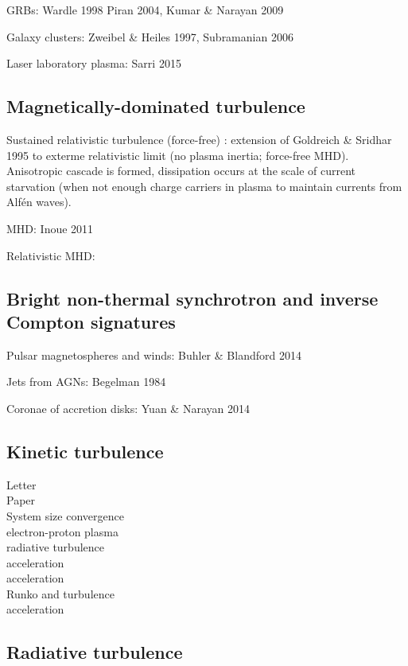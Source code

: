 \documentclass{aa}
\begin{document}
GRBs:
Wardle 1998
Piran 2004, Kumar \& Narayan 2009

Galaxy clusters:
Zweibel \& Heiles 1997, Subramanian 2006

Laser laboratory plasma:
Sarri 2015


\subsection{Magnetically-dominated turbulence}

Sustained relativistic turbulence (force-free)
\citep{Thompson_1998}: extension of Goldreich \& Sridhar 1995 to exterme relativistic limit (no plasma inertia; force-free MHD).
Anisotropic cascade is formed, dissipation occurs at the scale of current starvation (when not enough charge carriers in plasma to maintain currents from Alf\'en waves).

MHD:
\citep{Cho_2005}
Inoue 2011
\citep{Cho_2014}
\citep{Zrake_2016}

Relativistic MHD:
\citep{Zrake_2012}
\citep{Zrake_2014}

\subsection{Bright non-thermal synchrotron and inverse Compton signatures}
Pulsar magnetospheres and winds:
Buhler \& Blandford 2014

Jets from AGNs: Begelman 1984

Coronae of accretion disks:
Yuan \& Narayan 2014

\subsection{Kinetic turbulence}

\citep{Zhdankin_2017a} Letter\\
\citep{Zhdankin_2017b} Paper\\
\citep{Zhdankin_2018} System size convergence\\
\citep{Zhdankin_2019a} electron-proton plasma\\
\citep{Zhdankin_2019b} radiative turbulence\\
\citep{Comisso_2018} acceleration\\
\citep{Wong_2019} acceleration\\
\citep{Nattila_2019} Runko and turbulence\\
\citep{Comisso_2019} acceleration\\

\subsection{Radiative turbulence}
\end{document}
